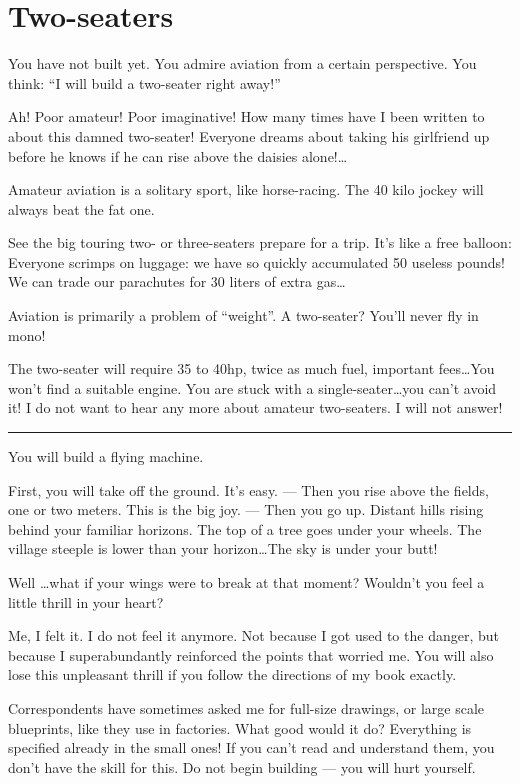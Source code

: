 \documentclass{book}
\newcommand*\sectline{
  \vspace{5pt}
  \begin{center}
    \rule{0.5\linewidth}{\linethickness}
  \end{center}
  \vspace{5pt}
}
\begin{document}
\section{Two-seaters}

You have not built yet. You admire aviation from a certain perspective.
You think: ``I will build a two-seater right away!''

Ah! Poor amateur! Poor imaginative! How many times have I been written
to about this damned two-seater! Everyone dreams about taking his
girlfriend up before he knows if he can rise above the daisies
alone!\ldots{}

Amateur aviation is a solitary sport, like horse-racing. The 40 kilo
jockey will always beat the fat one.

See the big touring two- or three-seaters prepare for a trip. It's
like a free balloon: Everyone scrimps on luggage: we have so quickly
accumulated 50 useless pounds! We can trade our parachutes for 30
liters of extra gas\ldots

Aviation is primarily a problem of ``weight''. A two-seater? You'll
never fly in mono!

The two-seater will require 35 to 40hp, twice as much fuel, important
fees\ldots You won't find a suitable engine. You are stuck with a
single-seater\ldots you can't avoid it!  I do not want to hear any
more about amateur two-seaters. I will not answer!

\sectline

You will build a flying machine.

First, you will take off the ground. It's easy. --- Then you rise
above the fields, one or two meters. This is the big joy. --- Then you
go up.  Distant hills rising behind your familiar horizons. The top of
a tree goes under your wheels. The village steeple is lower than your
horizon\ldots The sky is under your butt!

Well \ldots what if your wings were to break at that moment?  Wouldn't
you feel a little thrill in your heart?

Me, I felt it. I do not feel it anymore. Not because I got used to the
danger, but because I superabundantly reinforced the points that
worried me. You will also lose this unpleasant thrill if you follow
the directions of my book exactly.

Correspondents have sometimes asked me for full-size drawings, or
large scale blueprints, like they use in factories. What good would it
do?  Everything is specified already in the small ones! If you can't
read and understand them, you don't have the skill for this. Do not
begin building --- you will hurt yourself.
\end{document}
